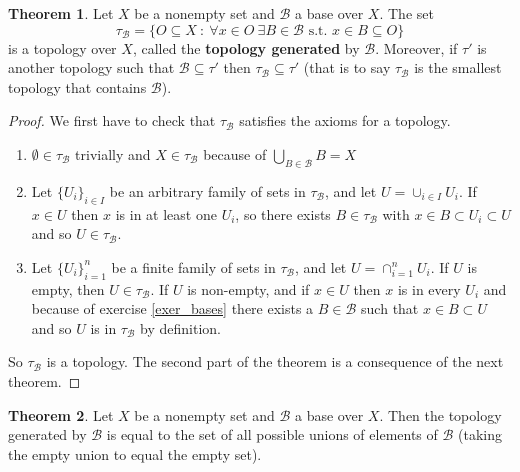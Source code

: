 \documentclass[a4paper]{book}
\theoremstyle{definition}
\newtheorem{theorem}{Theorem}[section]
\theoremstyle{ejemplo}
\theoremstyle{demostracion}
\begin{document}
\begin{theorem}\label{thm:topology_from_base}
	Let $X$ be a nonempty set and $\mathcal{B}$ a base over $X$. The set
	\begin{equation*}
		\tau_{\mathcal{B}} = \{O \subseteq X\ :\ \forall x \in O\ \exists B \in \mathcal{B} \text{ s.t. } x \in B \subseteq O\}
	\end{equation*}
	is a topology over $X$, called the \textbf{topology generated} by $\mathcal{B}$. Moreover, if $\tau'$ is another topology such that $\mathcal{B} \subseteq \tau'$ then $\tau_{\mathcal{B}} \subseteq \tau'$ (that is to say $\tau_{\mathcal{B}}$ is the smallest topology that contains $\mathcal{B}$).
\end{theorem}

\begin{proof}
	We first have to check that $\tau_{\mathcal{B}}$ satisfies the axioms for a topology.
	\begin{enumerate}
		\item
		$\emptyset \in \tau_{\mathcal{B}}$ trivially and $X \in \tau_{\mathcal{B}}$ because of $\bigcup_{B \in \mathcal{B}} B = X$
		
		\item
		Let $\{ U_i\}_{i \in I}$ be an arbitrary family of sets in $\tau_{\mathcal{B}}$, and let $U = \cup_{i \in I} U_i$. If $x \in U$ then $x$ is in at least one $U_i$, so there exists $B \in \tau_{\mathcal{B}}$ with $x \in B \subset U_i \subset U$ and so $U \in \tau_{\mathcal{B}}$.
		
		\item
		Let $\{ U_i\}_{i = 1}^{n}$ be a finite family of sets in $\tau_{\mathcal{B}}$, and let $U = \cap_{i = 1}^{n} U_i$. If $U$ is empty, then $U \in \tau_{\mathcal{B}}$. If $U$ is non-empty, and if $x \in U$ then $x$ is in every $U_i$ and because of exercise \eqref{exer_bases} there exists a $B \in \mathcal{B}$ such that $x \in B \subset U$ and so $U$ is in $\tau_{\mathcal{B}}$ by definition.
	\end{enumerate}
	So $\tau_{\mathcal{B}}$ is a topology. The second part of the theorem is a consequence of the next theorem.
\end{proof}

\begin{theorem}\label{thm:union_of_basic_elements_is_topology}
	Let $X$ be a nonempty set and $\mathcal{B}$ a base over $X$. Then the topology generated by $\mathcal{B}$ is equal to the set of all possible unions of elements of $\mathcal{B}$ (taking the empty union to equal the empty set).
\end{theorem}
\end{document}
